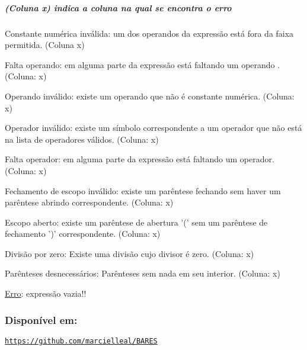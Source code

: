 \subparagraph*{(Coluna x) indica a coluna na qual se encontra o erro}


\begin{DoxyItemize}
\item Constante numérica inválida\-: um dos operandos da expressão está fora da faixa permitida. (Coluna x)
\item Falta operando\-: em alguma parte da expressão está faltando um operando . (Coluna\-: x)
\item Operando inválido\-: existe um operando que não é constante numérica. (Coluna\-: x)
\item Operador inválido\-: existe um símbolo correspondente a um operador que não está na lista de operadores válidos. (Coluna\-: x)
\item Falta operador\-: em alguma parte da expressão está faltando um operador. (Coluna\-: x)
\item Fechamento de escopo inválido\-: existe um parêntese fechando sem haver um parêntese abrindo correspondente. (Coluna\-: x)
\item Escopo aberto\-: existe um parêntese de abertura '(' sem um parêntese de fechamento ')' correspondente. (Coluna\-: x)
\item Divisão por zero\-: Existe uma divisão cujo divisor é zero. (Coluna\-: x)
\item Parênteses desnecessários\-: Parênteses sem nada em seu interior. (Coluna\-: x)
\item \hyperlink{class_erro}{Erro}\-: expressão vazia!!
\end{DoxyItemize}

\subsubsection*{Disponível em\-:}

\href{https://github.com/marcielleal/BARES}{\tt https\-://github.\-com/marcielleal/\-B\-A\-R\-E\-S} 